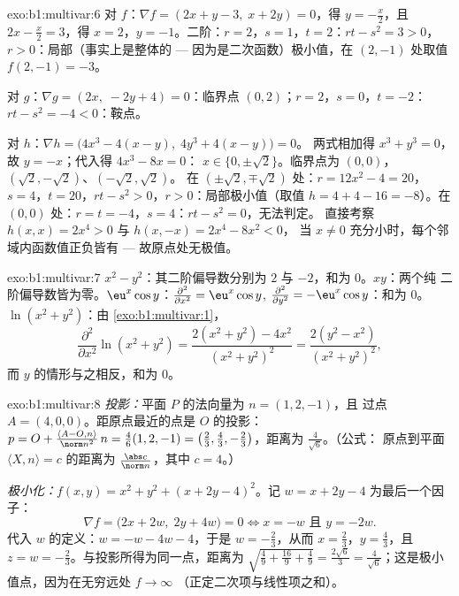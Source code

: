\begin{solution}{exo:b1:multivar:6}
对 $f$：$\nabla f = (2x + y - 3,\; x + 2y) = 0$，得 $y = -\frac x2$，且
$2x - \frac x2 = 3$，得 $x = 2$，$y = -1$。二阶：$r = 2$，$s =
1$，$t = 2$：$rt - s^2 = 3 > 0$，$r > 0$：局部（事实上是整体的 ---
因为是二次函数）极小值，在 $(2, -1)$ 处取值 $f(2,-1) = -3$。

对 $g$：$\nabla g = (2x,\; -2y + 4) = 0$：临界点 $(0, 2)$；$r = 2$，$s
= 0$，$t = -2$：$rt - s^2 = -4 < 0$：鞍点。

对 $h$：$\nabla h = \bigl(4x^3 - 4(x - y),\; 4y^3 + 4(x-y)\bigr) = 0$。
两式相加得 $x^3 + y^3 = 0$，故 $y = -x$；代入得 $4x^3 - 8x = 0$：
$x \in \{0, \pm\sqrt2\}$。临界点为 $(0,0)$，
$(\sqrt2, -\sqrt2)$、$(-\sqrt2, \sqrt2)$。
在 $(\pm\sqrt2, \mp\sqrt2)$ 处：$r = 12x^2 - 4 = 20$，$s = 4$，$t =
20$，$rt - s^2 > 0$，$r > 0$：局部极小值（取值 $h = 4 + 4 - 16 =
-8$）。在 $(0,0)$ 处：$r = t = -4$，$s = 4$：$rt - s^2 = 0$，无法判定。
直接考察 $h(x, x) = 2x^4 > 0$ 与 $h(x, -x) = 2x^4 - 8x^2 < 0$，
当 $x \neq 0$ 充分小时，每个邻域内函数值正负皆有 ---
故原点处无极值。
\end{solution}

\begin{solution}{exo:b1:multivar:7}
$x^2 - y^2$：其二阶偏导数分别为 $2$ 与 $-2$，和为 $0$。$xy$：两个纯
二阶偏导数皆为零。$\eu^x\cos y$：$\frac{\partial^2}{\partial
x^2} = \eu^x\cos y$, $\frac{\partial^2}{\partial y^2} =
-\eu^x\cos y$：和为 $0$。$\ln(x^2+y^2)$：由
\cref{exo:b1:multivar:1}，
\[
\frac{\partial^2}{\partial x^2}\ln(x^2+y^2)
= \frac{2(x^2+y^2) - 4x^2}{(x^2+y^2)^2}
= \frac{2(y^2 - x^2)}{(x^2+y^2)^2},
\]
而 $y$ 的情形与之相反，和为 $0$。
\end{solution}

\begin{solution}{exo:b1:multivar:8}
\emph{投影：}平面 $P$ 的法向量为 $n = (1, 2, -1)$，且
过点 $A = (4, 0, 0)$。距原点最近的点是
$O$ 的投影：$p = O + \frac{\langle A - O, n\rangle}{\norm
n^2}\,n = \frac{4}{6}(1,2,-1) = \bigl(\frac23, \frac43,
-\frac23\bigr)$，距离为 $\frac{4}{\sqrt 6}$。（公式：
原点到平面 $\langle X, n \rangle = c$ 的距离为
$\frac{\abs c}{\norm n}$，其中 $c = 4$。）

\emph{极小化：}$f(x,y) = x^2 + y^2 + (x + 2y - 4)^2$。记
$w = x + 2y - 4$ 为最后一个因子：
\[
\nabla f = \bigl(2x + 2w,\; 2y + 4w\bigr) = 0
\iff x = -w \text{ 且 } y = -2w .
\]
代入 $w$ 的定义：$w = -w - 4w - 4$，于是 $w =
-\frac23$，从而 $x = \frac23$，$y = \frac43$，且 $z = w =
-\frac23$。与投影所得为同一点，距离为
$\sqrt{\frac49 + \frac{16}{9} + \frac49} = \frac{2\sqrt 6}{3} =
\frac{4}{\sqrt6}$；这是极小值点，因为在无穷远处 $f \to \infty$
（正定二次项与线性项之和）。
\end{solution}

